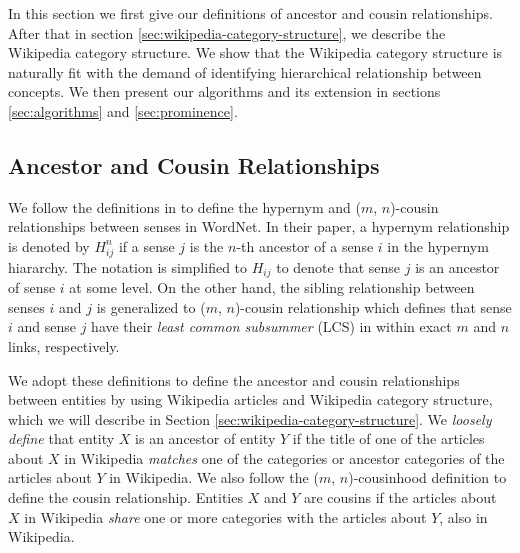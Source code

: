 







In this section we first give our definitions of ancestor and cousin relationships. After that in section \ref{sec:wikipedia-category-structure}, we describe the Wikipedia category structure. We show that the Wikipedia category structure is naturally fit with the demand of identifying hierarchical relationship between concepts. We then present our algorithms and its extension in sections \ref{sec:algorithms} and \ref{sec:prominence}.

\subsection{Ancestor and Cousin Relationships}
\label{sec:definitions}
We follow the definitions in \cite{Snow2006} to define the hypernym and ($m$, $n$)-cousin relationships between senses in WordNet.
In their paper, a hypernym relationship is denoted by $H_{ij}^{n}$ if a sense $j$ is the $n$-th ancestor of a sense $i$ in the hypernym hiararchy.
The notation is simplified to $H_{ij}$ to denote that sense $j$ is an ancestor of sense $i$ at some level.
On the other hand, the sibling relationship between senses $i$ and $j$ is generalized to ($m$, $n$)-cousin relationship which defines that sense $i$ and sense $j$ have their {\em least common subsummer} (LCS) in within exact $m$ and $n$ links, respectively.

We adopt these definitions to define the ancestor and cousin relationships between entities by using Wikipedia articles and Wikipedia category structure, which we will describe in Section \ref{sec:wikipedia-category-structure}.
We {\em loosely define} that entity $X$ is an ancestor of entity $Y$ if the title of one of the articles about $X$ in Wikipedia {\em matches} one of the categories or ancestor categories of the articles about $Y$ in Wikipedia.
We also follow the ($m$, $n$)-cousinhood definition to define the cousin relationship. Entities $X$ and $Y$ are cousins if the articles about $X$ in Wikipedia {\em share} one or more categories with the articles about $Y$, also in Wikipedia.

